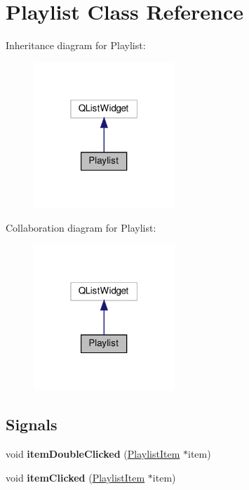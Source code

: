 \hypertarget{classPlaylist}{}\section{Playlist Class Reference}
\label{classPlaylist}


Inheritance diagram for Playlist\+:\nopagebreak
\begin{figure}[H]
\begin{center}
\leavevmode
\includegraphics[width=151pt]{classPlaylist__inherit__graph}
\end{center}
\end{figure}


Collaboration diagram for Playlist\+:\nopagebreak
\begin{figure}[H]
\begin{center}
\leavevmode
\includegraphics[width=151pt]{classPlaylist__coll__graph}
\end{center}
\end{figure}
\subsection*{Signals}
\begin{DoxyCompactItemize}
\item 
\mbox{\label{classPlaylist_ad3fb0ec925f1ba71c7ca8d3152645c4a}} 
void {\bfseries item\+Double\+Clicked} (\hyperlink{classPlaylistItem}{Playlist\+Item} $\ast$item)
\item 
\mbox{\label{classPlaylist_a0a4a4754313dd19270cd43c9a3671bdc}} 
void {\bfseries item\+Clicked} (\hyperlink{classPlaylistItem}{Playlist\+Item} $\ast$item)
\end{DoxyCompactItemize}
